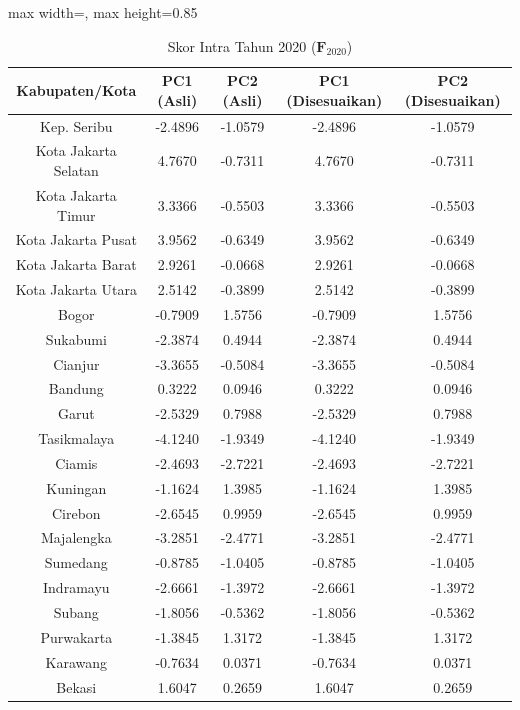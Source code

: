 \begin{table}[H]
\centering
\caption{Skor Intra Tahun 2020 ($\mathbf{F}_{2020}$)} \makeatletter{}\makeatother
\begin{adjustbox}{max width=\textwidth, max height=0.85\textheight}
\begin{tabular}{|c|c|c|c|c|}
\hline
\textbf{Kabupaten/Kota} & \textbf{PC1 (Asli)} & \textbf{PC2 (Asli)} & \textbf{PC1 (Disesuaikan)} & \textbf{PC2 (Disesuaikan)} \\
\hline
Kep. Seribu & -2.4896 & -1.0579 & -2.4896 & -1.0579 \\
Kota Jakarta Selatan & 4.7670 & -0.7311 & 4.7670 & -0.7311 \\
Kota Jakarta Timur & 3.3366 & -0.5503 & 3.3366 & -0.5503 \\
Kota Jakarta Pusat & 3.9562 & -0.6349 & 3.9562 & -0.6349 \\
Kota Jakarta Barat & 2.9261 & -0.0668 & 2.9261 & -0.0668 \\
Kota Jakarta Utara & 2.5142 & -0.3899 & 2.5142 & -0.3899 \\
Bogor & -0.7909 & 1.5756 & -0.7909 & 1.5756 \\
Sukabumi & -2.3874 & 0.4944 & -2.3874 & 0.4944 \\
Cianjur & -3.3655 & -0.5084 & -3.3655 & -0.5084 \\
Bandung & 0.3222 & 0.0946 & 0.3222 & 0.0946 \\
Garut & -2.5329 & 0.7988 & -2.5329 & 0.7988 \\
Tasikmalaya & -4.1240 & -1.9349 & -4.1240 & -1.9349 \\
Ciamis & -2.4693 & -2.7221 & -2.4693 & -2.7221 \\
Kuningan & -1.1624 & 1.3985 & -1.1624 & 1.3985 \\
Cirebon & -2.6545 & 0.9959 & -2.6545 & 0.9959 \\
Majalengka & -3.2851 & -2.4771 & -3.2851 & -2.4771 \\
Sumedang & -0.8785 & -1.0405 & -0.8785 & -1.0405 \\
Indramayu & -2.6661 & -1.3972 & -2.6661 & -1.3972 \\
Subang & -1.8056 & -0.5362 & -1.8056 & -0.5362 \\
Purwakarta & -1.3845 & 1.3172 & -1.3845 & 1.3172 \\
Karawang & -0.7634 & 0.0371 & -0.7634 & 0.0371 \\
Bekasi & 1.6047 & 0.2659 & 1.6047 & 0.2659 \\

\end{tabular}
\end{adjustbox}
\end{table}
